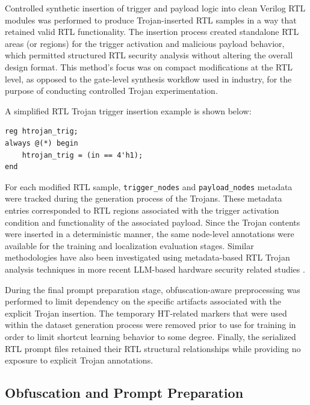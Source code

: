 \documentclass[conference]{IEEEtran}
\begin{document}
Controlled synthetic insertion of trigger and payload logic into clean Verilog RTL modules was performed to produce Trojan-inserted RTL samples in a way that retained valid RTL functionality. The insertion process created standalone RTL areas (or regions) for the trigger activation and malicious payload behavior, which permitted structured RTL security analysis without altering the overall design format. This method’s focus was on compact modifications at the RTL level, as opposed to the gate-level synthesis workflow used in industry, for the purpose of conducting controlled Trojan experimentation. 


A simplified RTL Trojan trigger insertion example is shown below:

\begin{verbatim}
reg htrojan_trig;
always @(*) begin
    htrojan_trig = (in == 4'h1);
end
\end{verbatim}

For each modified RTL sample, \texttt{trigger\_nodes} and \texttt{payload\_nodes} metadata were tracked during the generation process of the Trojans. These metadata entries corresponded to RTL regions associated with the trigger activation condition and functionality of the associated payload. Since the Trojan contents were inserted in a deterministic manner, the same node-level annotations were available for the training and localization evaluation stages. Similar methodologies have also been investigated using metadata-based RTL Trojan analysis techniques in more recent LLM-based hardware security related studies \cite{kundu2025pearl,trojanwhisper}.

During the final prompt preparation stage, obfuscation-aware preprocessing was performed to limit dependency on the specific artifacts associated with the explicit Trojan insertion. The temporary HT-related markers that were used within the dataset generation process were removed prior to use for training in order to limit shortcut learning behavior to some degree. Finally, the serialized RTL prompt files retained their RTL structural relationships while providing no exposure to explicit Trojan annotations.

\subsection{Obfuscation and Prompt Preparation}
\label{subsec:obfuscation_prompt}
\end{document}
